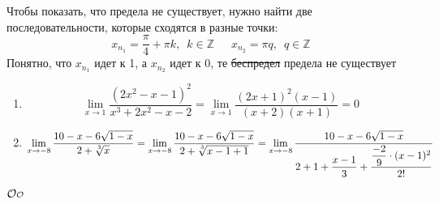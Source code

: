 \documentclass{report}
\newcommand\smallO{
  \mathchoice
    {{\scriptstyle\mathcal{O}}}%
    {{\scriptstyle\mathcal{O}}}%
    {{\scriptscriptstyle\mathcal{O}}}%
    {\scalebox{.7}{$\scriptscriptstyle\mathcal{O}$}}%
  }
\begin{document}
\sol
Чтобы показать, что предела не существует, нужно найти две последовательности, которые сходятся в разные точки:
\begin{equation*}
	x_{n_1}=\dfrac{\pi}{4}+\pi k, \enspace k \in \mathbb{Z} \quad \enspace
	x_{n_2}=\pi q, \enspace q \in \mathbb{Z}
\end{equation*}
Понятно, что $x_{n_1}$ идет к 1, а $x_{n_2}$ идет к 0, те \sout{беспредел} предела не существует


\sol
\begin{enumerate}
\item
\[
\lim\limits_{x\to1}\dfrac{\left(2x^{2}-x-1\right)^{2}}{x^{3}+2x^{2}-x-2}=\lim\limits_{x\to1}\dfrac{(2x+1)^2(x-1)}{(x+2)(x+1)}=0
\]
\item
\[
\lim\limits_{x\to-8}\dfrac{10-x-6\sqrt{1-x}}{2+\sqrt[\leftroot{0}\uproot{2}3]{x}}=\lim\limits_{x\to-8}\dfrac{10-x-6\sqrt{1-x}}{2+\sqrt[\leftroot{0}\uproot{2}3]{x-1+1}}=
		\lim\limits_{x\to-8}\dfrac{10-x-6\sqrt{1-x}}{2+1+\dfrac{x-1}{3}+\dfrac{\dfrac{-2}{9}\cdot(x-1)^2}{2!}}
\]
\end{enumerate}
$\mathcal{O} \smallO$
\end{document}
